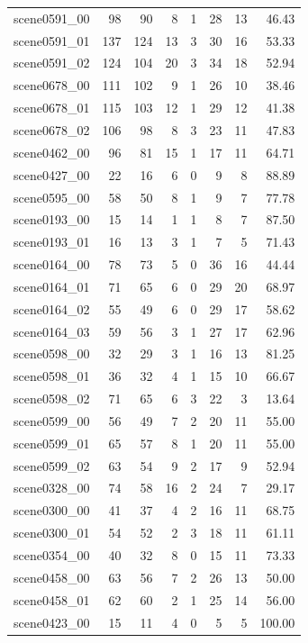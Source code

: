 \begin{table}[t]
\begin{tabular}{lrrrrrrr}
scene0591\_00 & 98 & 90 & 8 & 1 & 28 & 13 & 46.43 \\
scene0591\_01 & 137 & 124 & 13 & 3 & 30 & 16 & 53.33 \\
scene0591\_02 & 124 & 104 & 20 & 3 & 34 & 18 & 52.94 \\
scene0678\_00 & 111 & 102 & 9 & 1 & 26 & 10 & 38.46 \\
scene0678\_01 & 115 & 103 & 12 & 1 & 29 & 12 & 41.38 \\
scene0678\_02 & 106 & 98 & 8 & 3 & 23 & 11 & 47.83 \\
scene0462\_00 & 96 & 81 & 15 & 1 & 17 & 11 & 64.71 \\
scene0427\_00 & 22 & 16 & 6 & 0 & 9 & 8 & 88.89 \\
scene0595\_00 & 58 & 50 & 8 & 1 & 9 & 7 & 77.78 \\
scene0193\_00 & 15 & 14 & 1 & 1 & 8 & 7 & 87.50 \\
scene0193\_01 & 16 & 13 & 3 & 1 & 7 & 5 & 71.43 \\
scene0164\_00 & 78 & 73 & 5 & 0 & 36 & 16 & 44.44 \\
scene0164\_01 & 71 & 65 & 6 & 0 & 29 & 20 & 68.97 \\
scene0164\_02 & 55 & 49 & 6 & 0 & 29 & 17 & 58.62 \\
scene0164\_03 & 59 & 56 & 3 & 1 & 27 & 17 & 62.96 \\
scene0598\_00 & 32 & 29 & 3 & 1 & 16 & 13 & 81.25 \\
scene0598\_01 & 36 & 32 & 4 & 1 & 15 & 10 & 66.67 \\
scene0598\_02 & 71 & 65 & 6 & 3 & 22 & 3 & 13.64 \\
scene0599\_00 & 56 & 49 & 7 & 2 & 20 & 11 & 55.00 \\
scene0599\_01 & 65 & 57 & 8 & 1 & 20 & 11 & 55.00 \\
scene0599\_02 & 63 & 54 & 9 & 2 & 17 & 9 & 52.94 \\
scene0328\_00 & 74 & 58 & 16 & 2 & 24 & 7 & 29.17 \\
scene0300\_00 & 41 & 37 & 4 & 2 & 16 & 11 & 68.75 \\
scene0300\_01 & 54 & 52 & 2 & 3 & 18 & 11 & 61.11 \\
scene0354\_00 & 40 & 32 & 8 & 0 & 15 & 11 & 73.33 \\
scene0458\_00 & 63 & 56 & 7 & 2 & 26 & 13 & 50.00 \\
scene0458\_01 & 62 & 60 & 2 & 1 & 25 & 14 & 56.00 \\
scene0423\_00 & 15 & 11 & 4 & 0 & 5 & 5 & 100.00 \\

\end{tabular}
\end{table}
